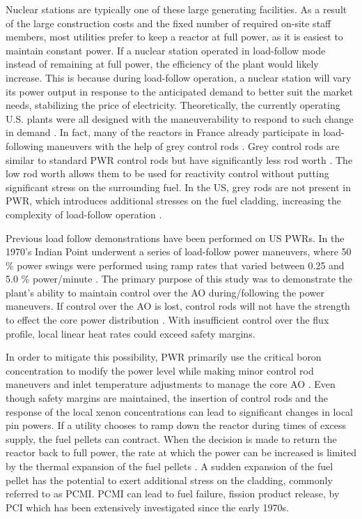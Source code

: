\documentclass[edeposit,fullpage,11pt]{uiucthesis2009}
\begin{document}
Nuclear stations are typically one of these large generating facilities.
As a result of the large construction costs and the fixed number of required on-site staff members, most utilities prefer to keep a reactor at full power, as it is easiest to maintain constant power. 
If a nuclear station operated in load-follow mode instead of remaining at full power, the efficiency of the plant would likely increase.
This is because during load-follow operation, a nuclear station will vary its power output in response to the anticipated demand to better suit the market needs, stabilizing the price of electricity.
Theoretically, the currently operating U.S. plants were all designed with the maneuverability to respond to such change in demand \cite{lokhov_technical_2011}.
In fact, many of the reactors in France already participate in load-following maneuvers with the help of grey control rods \cite{lokhov_technical_2011}.
Grey control rods are similar to standard \gls{PWR} control rods but have significantly less rod worth \cite{yousefpour_improvement_2000}.
The low rod worth allows them to be used for reactivity control without putting significant stress on the surrounding fuel. 
In the \gls{US}, grey rods are not present in \gls{PWR}, which introduces additional stresses on the fuel cladding, increasing the complexity of load-follow operation \cite{lokhov_technical_2011}.
  
Previous load follow demonstrations have been performed on \gls{US} \gls{PWR}s.
In the 1970's Indian Point underwent a series of load-follow power maneuvers, where 50 \% power swings were performed using ramp rates that varied between 0.25 and 5.0 \% power/minute \cite{sipush_load-follow_1976}.
The primary purpose of this study was to demonstrate the plant's ability to maintain control over the \gls{AO} during/following the power maneuvers. 
If control over the \gls{AO} is lost, control rods will not have the strength to effect the core power distribution  \cite{sipush_load-follow_1976}.
With insufficient control over the flux profile, local linear heat rates could exceed safety margins.

In order to mitigate this possibility, \gls{PWR} primarily use the critical boron concentration to modify the power level while making minor control rod maneuvers and inlet temperature adjustments to manage the core \gls{AO} \cite{meyer_improved_1978}.  
Even though safety margins are maintained, the insertion of control rods and the response of the local xenon concentrations can lead to significant changes in local pin powers.
If a utility chooses to ramp down the reactor during times of excess supply, the fuel pellets can contract.
When the decision is made to return the reactor back to full power, the rate at which the power can be increased is limited by the thermal expansion of the fuel pellets \cite{gartner_power_1984}.
A sudden expansion of the fuel pellet has the potential to exert additional stress on the cladding, commonly referred to as \gls{PCMI}.
\gls{PCMI} can lead to fuel failure, fission product release, by \gls{PCI} which has been extensively investigated since the early 1970s.
\end{document}
